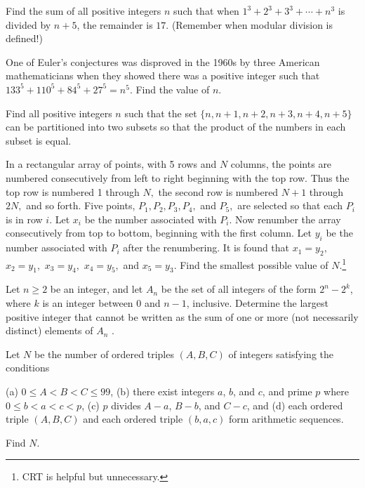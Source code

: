 \documentclass[mast]{lucky}
\begin{document}
\begin{prob}[AOIME 2020/10]{6}
Find the sum of all positive integers $n$ such that when $1^3+2^3+3^3+\cdots+n^3$ is divided by $n+5$, the remainder is $17.$ (Remember when modular division is defined!)
\end{prob}

\begin{req}[AIME 1989/9]{9}
One of Euler's conjectures was disproved in the 1960s by three American mathematicians when they showed there was a positive integer such that $133^5+110^5+84^5+27^5=n^{5}$. Find the value of $n$.
\end{req}

\begin{prob}[IMO 1970/4]{9}
Find all positive integers $n$ such that the set $\{n,n+1,n+2,n+3,n+4,n+5\}$ can be partitioned into two subsets so that the product of the numbers in each subset is equal.
\end{prob}

\begin{prob}[AIME I 2001/11]{9}
In a rectangular array of points, with 5 rows and $N$ columns, the points are numbered consecutively from left to right beginning with the top row. Thus the top row is numbered 1 through $N,$ the second row is numbered $N+1$ through $2N,$ and so forth. Five points, $P_1, P_2, P_3, P_4,$ and $P_5,$ are selected so that each $P_i$ is in row $i.$ Let $x_i$ be the number associated with $P_i.$ Now renumber the array consecutively from top to bottom, beginning with the first column. Let $y_i$ be the number associated with $P_i$ after the renumbering. It is found that $x_1=y_2,$ $x_2=y_1,$ $x_3=y_4,$ $x_4=y_5,$ and $x_5=y_3.$ Find the smallest possible value of $N.$\footnote{CRT is helpful but unnecessary.}
\end{prob}
    
\begin{prob}[ISL 2014/N1]{13}
Let $n \ge 2$ be an integer, and let $A_n$ be the set of all integers of the form $2^n-2^k$, where $k$ is an integer between $0$ and $n-1$, inclusive. Determine the largest positive integer that cannot be written as the sum of one or more (not necessarily distinct) elements of $A_n$ .
\end{prob}

\begin{prob}[AIME I 2013/15]{13}
Let $N$ be the number of ordered triples $(A,B,C)$ of integers satisfying the conditions

(a) $0\leq A<B<C\leq99$,
(b) there exist integers $a$, $b$, and $c$, and prime $p$ where $0\leq b < a < c < p$,
(c) $p$ divides $A-a$, $B-b$, and $C-c$, and
(d) each ordered triple $(A,B,C)$ and each ordered triple $(b,a,c)$ form arithmetic sequences.

Find $N$.
\end{prob}
\end{document}
